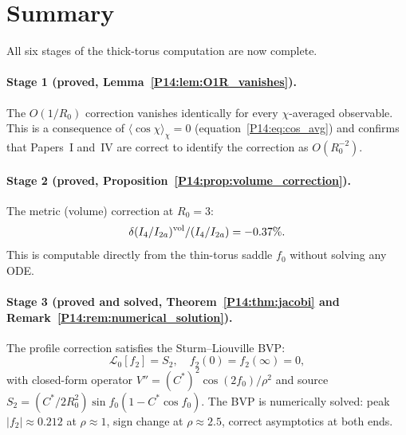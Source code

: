 \documentclass[11pt,a4paper]{article}
\theoremstyle{definition}
\theoremstyle{remark}
\newcommand{\Cstar}{C^*}
\newcommand{\fzero}{f_0}
\newcommand{\ftwo}{f_2}
\newcommand{\Ltwo}{\mathcal{L}_0}
\newcommand{\Stwo}{S_2}
\newcommand{\Rzero}{R_0}
\begin{document}
\section{Summary}
\label{P14:sec:summary}

All six stages of the thick-torus computation are now complete.

\paragraph{Stage 1 (proved, Lemma~\ref{P14:lem:O1R_vanishes}).}
The $O(1/\Rzero)$ correction vanishes identically for every
$\chi$-averaged observable.
This is a consequence of $\langle\cos\chi\rangle_\chi=0$
(equation~\eqref{P14:eq:cos_avg}) and confirms that Papers~I and~IV are
correct to identify the correction as $O(\Rzero^{-2})$.

\paragraph{Stage 2 (proved, Proposition~\ref{P14:prop:volume_correction}).}
The metric (volume) correction at $\Rzero=3$:
\begin{equation*}
  \delta(I_4/I_{2a})^{\rm vol}/(I_4/I_{2a}) = -0.37\%.
\end{equation*}
This is computable directly from the thin-torus saddle $\fzero$
without solving any ODE.

\paragraph{Stage 3 (proved and solved, Theorem~\ref{P14:thm:jacobi} and Remark~\ref{P14:rem:numerical_solution}).}
The profile correction satisfies the Sturm--Liouville BVP:
\begin{equation*}
  \Ltwo[\ftwo] = \Stwo, \quad \ftwo(0)=\ftwo(\infty)=0,
\end{equation*}
with closed-form operator $V''=({C^*})^2\cos(2\fzero)/\rho^2$ and
source $\Stwo=(\Cstar/2\Rzero^2)\sin\fzero(1-\Cstar\cos\fzero)$.
The BVP is numerically solved: peak $|\ftwo|\approx0.212$ at $\rho\approx1$,
sign change at $\rho\approx2.5$, correct asymptotics at both ends.
\end{document}

